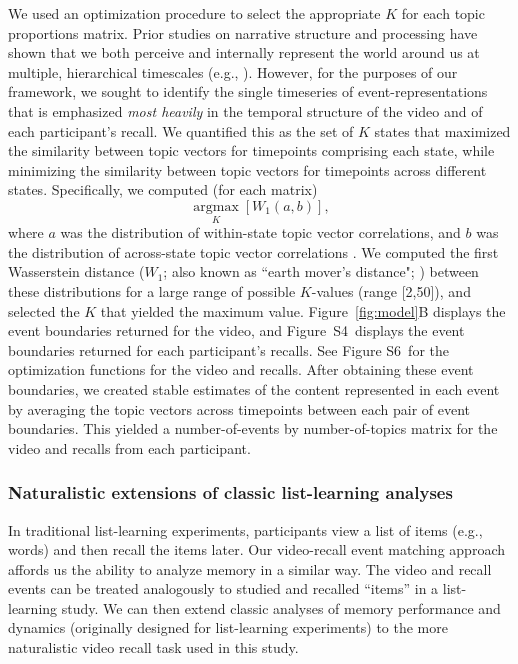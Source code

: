 \documentclass{article}
\newcommand{\argmax}{\mathop{\mathrm{argmax}}\limits}
\newcommand{\corrmats}{S4}
\newcommand{\kopt}{S6}
\begin{document}
We used an optimization procedure to select the appropriate $K$ for each topic proportions matrix.  Prior studies on narrative structure and processing have shown that we both perceive and internally represent the world around us at multiple, hierarchical timescales (e.g., \citealp{HassEtal08, LernEtal11, HassEtal15, ChenEtal17, BaldEtal17, BaldEtal18}).  However, for the purposes of our framework, we sought to identify the single timeseries of event-representations that is emphasized \textit{most heavily} in the temporal structure of the video and of each participant's recall.  We quantified this as the set of $K$ states that maximized the similarity between topic vectors for timepoints comprising each state, while minimizing the similarity between topic vectors for timepoints across different states.  Specifically, we computed (for each matrix)
\[
  \argmax_K \left[W_{1}(a, b)\right],
\]
where $a$ was the distribution of within-state topic vector correlations, and $b$ was the distribution of across-state topic vector correlations .  We computed the first Wasserstein distance ($W_{1}$; also known as ``earth mover's distance"; \citealp{Dobr70, RamdEtal17}) between these distributions for a large range of possible $K$-values (range [2,50]), and selected the $K$ that yielded the maximum value.  Figure~\ref{fig:model}B displays the event boundaries returned for the video, and Figure~\corrmats~displays the event boundaries returned for each participant's recalls.  See Figure \kopt~for the optimization functions for the video and recalls.  After obtaining these event boundaries, we created stable estimates of the content represented in each event by averaging the topic vectors across timepoints between each pair of event boundaries.  This yielded a number-of-events by number-of-topics matrix for the video and recalls from each participant.

\subsubsection*{Naturalistic extensions of classic list-learning analyses}
In traditional list-learning experiments, participants view a list of items (e.g., words) and then recall the items later.  Our video-recall event matching approach affords us the ability to analyze memory in a similar way. The video and recall events can be treated analogously to studied and recalled ``items'' in a list-learning study.  We can then extend classic analyses of memory performance and dynamics (originally designed for list-learning experiments) to the more naturalistic video recall task used in this study.
\end{document}
